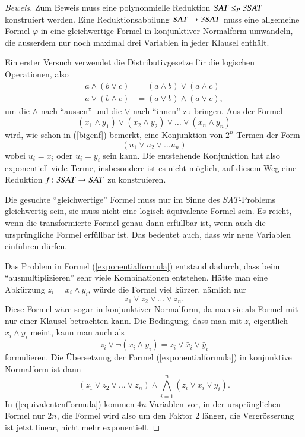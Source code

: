 \begin{proof}[Beweis]
Zum Beweis muss eine polynonmielle Reduktion
$\text{\textsl{SAT}}\le_P\text{\textsl{3SAT}}$ konstruiert werden.
Eine Reduktionsabbilung
$\text{\textsl{SAT}}\to\text{\textsl{3SAT}}$ muss eine allgemeine Formel
$\varphi$ in eine gleichwertige Formel in konjunktiver Normalform umwandeln, 
die ausserdem nur noch maximal drei Variablen in jeder Klausel enthält.

Ein erster Versuch verwendet die Distributivgesetze für die 
logischen Operationen, also
\begin{align*}
a\wedge(b\vee c)&=(a\wedge b)\vee(a\wedge c)\\
a\vee(b\wedge c)&=(a\vee b)\wedge(a\vee c),
\end{align*}
um die $\wedge$ nach ``aussen'' und die $\vee$ nach ``innen'' zu
bringen. Aus der Formel 
\begin{equation}
(x_1\wedge y_1)
\vee
(x_2\wedge y_2)
\vee
\dots
\vee
(x_n\wedge y_n)
\label{exponentialformula}
\end{equation}
wird, wie schon in (\ref{bigcnf}) bemerkt, eine Konjunktion von $2^n$
Termen der Form
\[
(u_1\vee u_2\vee \dots u_n)
\]
wobei $u_i=x_i$ oder $u_i=y_i$ sein kann. 
Die entstehende Konjunktion hat also exponentiell viele Terme, insbesondere
ist es nicht möglich, auf diesem Weg eine Reduktion
$f\colon\text{\textsl{3SAT}}\to\text{\textsl{SAT}}$ zu konstruieren.

Die gesuchte ``gleichwertige'' Formel muss nur im Sinne des
\textsl{SAT}-Problems gleichwertig sein, sie muss nicht eine
logisch äquivalente Formel sein. Es reicht, wenn die transformierte
Formel genau dann erfüllbar ist, wenn auch die ursprüngliche Formel
erfüllbar ist. Das bedeutet auch, dass wir neue Variablen einführen
dürfen.

Das Problem in Formel (\ref{exponentialformula}) entstand dadurch, dass
beim ``ausmultiplizieren'' sehr viele Kombinationen entstehen. Hätte
man eine Abkürzung $z_i=x_i\wedge y_i$, würde die Formel viel
kürzer, nämlich nur
\[
z_1\vee z_2\vee\dots\vee z_n.
\]
Diese Formel wäre sogar in konjunktiver Normalform, da man sie
als Formel mit nur einer Klausel betrachten kann.
Die Bedingung, dass man mit $z_i$ eigentlich $x_i\wedge y_i$ 
meint, kann man auch als 
\[
z_i\vee \neg(x_i\wedge y_i)
=
z_i\vee \bar x_i\vee\bar y_i
\]
formulieren. Die Übersetzung der Formel (\ref{exponentialformula})
in konjunktive Normalform ist dann
\begin{equation}
(z_1\vee z_2\vee\dots\vee z_n)
\wedge
\bigwedge_{i=1}^n (z_i\vee \bar x_i\vee\bar y_i).
\label{equivalentcnfformula}
\end{equation}
In (\ref{equivalentcnfformula}) kommen $4n$ Variablen vor,
in der ursprünglichen Formel
nur $2n$, die Formel wird also um den Faktor $2$ länger, die
Vergrösserung ist jetzt linear, nicht mehr exponentiell.


\end{proof}
